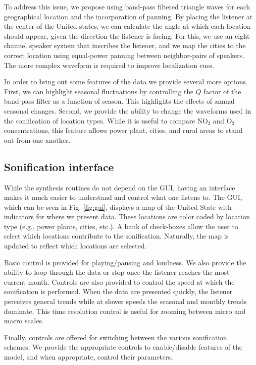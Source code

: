\documentclass[a4paper,10pt,oneside]{article}
\newcommand{\ce}[1]{$\mathrm{#1}$}
\begin{document}
\begin{sloppy}
To address this issue, we propose using band-pass filtered triangle waves for each geographical location and the incorporation of panning. By placing the listener at the center of the United states, we can calculate the angle at which each location should appear, given the direction the listener is facing.  For this, we use an eight channel speaker system that inscribes the listener, and we map the cities to the correct location using equal-power panning between neighbor-pairs of speakers.  The more complex waveform is required to improve localization cues.  

In order to bring out some features of the data we provide several more options. First, we can highlight seasonal fluctuations by controlling the $Q$ factor of the band-pass filter as a function of season. This highlights the effects of annual seasonal changes. Second, we provide the ability to change the waveforms used in the sonification of location types. While it is useful to compare \ce{NO_2} and \ce{O_3} concentrations, this feature allows power plant, cities, and rural areas to stand out from one another. 


\subsection{Sonification interface}

While the synthesis routines do not depend on the GUI, having an interface makes it much easier to understand and control what one listens to. The GUI, which can be seen in Fig. \ref{fig:gui}, displays a map of the United State with indicators for where we present data.  These locations are color coded by location type (e.g., power plants, cities, etc.). A bank of check-boxes allow the user to select which locations contribute to the sonification. Naturally, the map is updated to reflect which locations are selected.  


Basic control is provided for playing/pausing and loudness. We also provide the ability to loop through the data or stop once the listener reaches the most current month.  Controls are also provided to control the speed at which the sonification is performed.  When the data are presented quickly, the listener perceives general trends while at slower speeds the seasonal and monthly trends dominate.  This time resolution control is useful for zooming between micro and macro scales.  

Finally, controls are offered for switching between the various sonification schemes. We provide the appropriate controls to enable/disable features of the model, and when appropriate, control their parameters.  


\end{sloppy}
\end{document}

